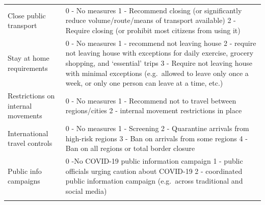 \documentclass[
  6pt,
]{article}
\begin{document}
\begin{longtable}[]{@{}ll@{}}
\begin{minipage}[t]{0.09\columnwidth}
Close public transport\strut
\end{minipage} & \begin{minipage}[t]{0.85\columnwidth}\raggedright
0 - No measures 1 - Recommend closing (or significantly reduce
volume/route/means of transport available) 2 - Require closing (or
prohibit most citizens from using it)\strut
\end{minipage}\tabularnewline
\begin{minipage}[t]{0.09\columnwidth}\raggedright
Stay at home requirements\strut
\end{minipage} & \begin{minipage}[t]{0.85\columnwidth}\raggedright
0 - No measures 1 - recommend not leaving house 2 - require not leaving
house with exceptions for daily exercise, grocery shopping, and
`essential' trips 3 - Require not leaving house with minimal exceptions
(e.g.~allowed to leave only once a week, or only one person can leave at
a time, etc.)\strut
\end{minipage}\tabularnewline
\begin{minipage}[t]{0.2\columnwidth}\raggedright
Restrictions on internal movements\strut
\end{minipage} & \begin{minipage}[t]{0.85\columnwidth}\raggedright
0 - No measures 1 - Recommend not to travel between regions/cities 2 -
internal movement restrictions in place\strut
\end{minipage}\tabularnewline
\begin{minipage}[t]{0.09\columnwidth}\raggedright
International travel controls\strut
\end{minipage} & \begin{minipage}[t]{0.85\columnwidth}\raggedright
0 - No measures 1 - Screening 2 - Quarantine arrivals from high-risk
regions 3 - Ban on arrivals from some regions 4 - Ban on all regions or
total border closure\strut
\end{minipage}\tabularnewline
\begin{minipage}[t]{0.09\columnwidth}\raggedright
Public info campaigns\strut
\end{minipage} & \begin{minipage}[t]{0.85\columnwidth}\raggedright
0 -No COVID-19 public information campaign 1 - public officials urging
caution about COVID-19 2 - coordinated public information campaign
(e.g.~across traditional and social media)\strut
\end{minipage}\tabularnewline
\begin{minipage}[t]{0.09\columnwidth}\raggedright

\end{minipage}
\end{longtable}
\end{document}

